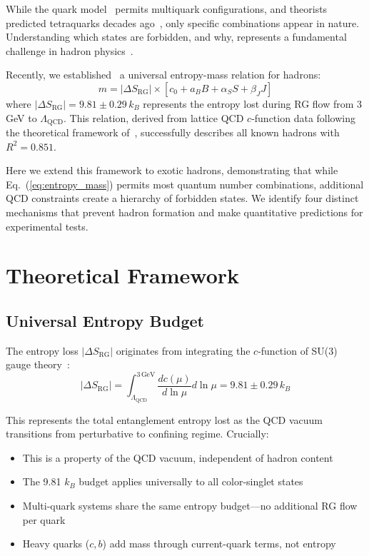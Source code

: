 \documentclass[12pt,a4paper]{article}
\begin{document}
While the quark model~\cite{Gell-Mann1964} permits multiquark configurations, and theorists predicted tetraquarks decades ago~\cite{Jaffe1977}, only specific combinations appear in nature. Understanding which states are forbidden, and why, represents a fundamental challenge in hadron physics~\cite{Guo2018,Lebed2017}.

Recently, we established~\cite{Tupay2025} a universal entropy-mass relation for hadrons:
\begin{equation}
m = |\Delta S_{\text{RG}}| \times [c_0 + a_B B + \alpha_S S + \beta_J J]
\label{eq:entropy_mass}
\end{equation}
where $|\Delta S_{\text{RG}}| = 9.81 \pm 0.29\,k_B$ represents the entropy lost during RG flow from 3 GeV to $\Lambda_{\text{QCD}}$. This relation, derived from lattice QCD $c$-function data following the theoretical framework of~\cite{Caswell1974,Komargodski2011}, successfully describes all known hadrons with $R^2 = 0.851$.

Here we extend this framework to exotic hadrons, demonstrating that while Eq.~(\ref{eq:entropy_mass}) permits most quantum number combinations, additional QCD constraints create a hierarchy of forbidden states. We identify four distinct mechanisms that prevent hadron formation and make quantitative predictions for experimental tests.

\section{Theoretical Framework}

\subsection{Universal Entropy Budget}

The entropy loss $|\Delta S_{\text{RG}}|$ originates from integrating the $c$-function of SU(3) gauge theory~\cite{Caswell1974,Komargodski2011}:
\begin{equation}
|\Delta S_{\text{RG}}| = \int_{\Lambda_{\text{QCD}}}^{3\,\text{GeV}} \frac{dc(\mu)}{d\ln\mu} d\ln\mu = 9.81 \pm 0.29\,k_B
\end{equation}

This represents the total entanglement entropy lost as the QCD vacuum transitions from perturbative to confining regime. Crucially:

\begin{itemize}
\item This is a property of the QCD vacuum, independent of hadron content
\item The 9.81 $k_B$ budget applies universally to all color-singlet states
\item Multi-quark systems share the same entropy budget—no additional RG flow per quark
\item Heavy quarks ($c,b$) add mass through current-quark terms, not entropy
\end{itemize}
\end{document}

